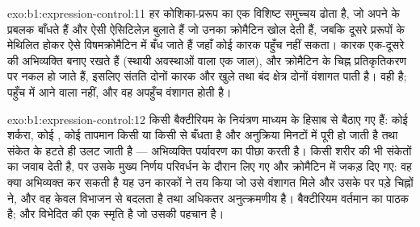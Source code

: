 \begin{solution}{exo:b1:expression-control:11}
हर कोशिका-प्ररूप  का एक विशिष्ट समुच्चय ढोता है, जो
अपने  के प्रबलक बाँधते हैं और ऐसी ऐसिटिलेज़ बुलाते हैं जो
उनका क्रोमैटिन खोल देती हैं, जबकि दूसरे प्ररूपों के  मेथिलित होकर
ऐसे विषमक्रोमैटिन में बँध जाते हैं जहाँ कोई कारक पहुँच नहीं सकता। कारक
एक-दूसरे की अभिव्यक्ति बनाए रखते हैं (स्थायी अवस्थाओं वाला एक जाल), और
क्रोमैटिन के चिह्न प्रतिकृतिकरण पर नकल हो जाते हैं, इसलिए संतति दोनों
कारक और खुले तथा बंद क्षेत्र दोनों वंशागत पाती है।  वही है;
पहुँच में आने वाला  नहीं, और वह अपहुँच
वंशागत होती है।
\end{solution}

\begin{solution}{exo:b1:expression-control:12}
किसी बैक्टीरियम के नियंत्रण माध्यम के हिसाब से बैठाए गए हैं: कोई शर्करा,
कोई , कोई तापमान किसी  या किसी  से बँधता है
और अनुक्रिया मिनटों में पूरी हो जाती है तथा संकेत के हटते ही उलट जाती है
--- अभिव्यक्ति पर्यावरण का पीछा करती है। किसी शरीर की  भी संकेतों
का जवाब देती है, पर उसके मुख्य निर्णय परिवर्धन के दौरान लिए गए और
क्रोमैटिन में जकड़ दिए गए: वह क्या अभिव्यक्त कर सकती है यह उन कारकों ने
तय किया जो उसे वंशागत मिले और उसके  पर पड़े चिह्नों ने, और वह केवल
विभाजन से बदलता है तथा अधिकतर अनुत्क्रमणीय है। बैक्टीरियम वर्तमान का
पाठक है; और विभेदित  की एक स्मृति है जो उसकी पहचान है।
\end{solution}


